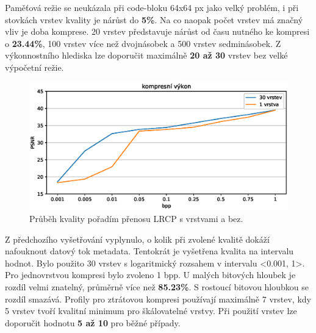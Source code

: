 \noindent Paměťová režie se neukázala při code-bloku 64x64 px jako velký problém, i při stovkách vrstev kvality je nárůst do \textbf{5\%}. Na co naopak počet vrstev má značný vliv je doba komprese. 20 vrstev představuje nárůst od času nutného ke kompresi o \textbf{23.44\%}, 100 vrstev více než dvojnásobek a 500 vrstev sedminásobek. Z výkonnostního hlediska lze doporučit maximálně \textbf{20 až 30} vrstev bez velké výpočetní režie. 
\clearpage

\begin{figure}[hbt!]
  \centering
  \hspace*{-0.75cm}
  \includegraphics[width=16cm]{obrazky-figures/layers.eps}
  \caption{Průběh kvality pořadím přenosu LRCP s vrstvami a bez.}
\end{figure}
Z předchozího vyšetřování vyplynulo, o kolik při zvolené kvalitě dokáží nafouknout datový tok metadata. Tentokrát je vyšetřena kvalita na intervalu hodnot. Bylo použito 30 vrstev s logaritmický rozsahem v intervalu <0.001, 1>. Pro jednovrstvou kompresi bylo zvoleno 1 bpp. U malých bitových hloubek je rozdíl velmi znatelný, průměrně více než \textbf{85.23\%}. S rostoucí bitovou hloubkou se rozdíl smazává. Profily pro ztrátovou kompresi používají maximálně 7 vrstev, kdy 5 vrstev tvoří kvalitní minimum pro škálovatelné vrstvy. Při použití vrstev lze doporučit hodnotu \textbf{5 až 10} pro běžné případy.

\clearpage

%
%
\newpage
